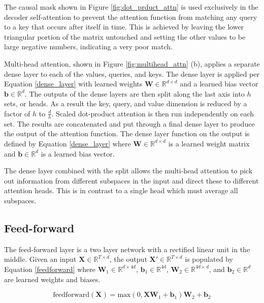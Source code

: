 The causal mask shown in Figure \ref{fig:dot_prduct_attn} is used exclusively in the decoder self-attention to prevent the attention function from matching any query to a key that occurs after itself in time.
This is achieved by leaving the lower triangular portion of the matrix untouched and setting the other values to be large negative numbers, indicating a very poor match.

Multi-head attention, shown in Figure \ref{fig:multihead_attn} (b), applies a separate dense layer to each of the values, queries, and keys. 
The dense layer is applied per Equation \ref{dense_layer} with learned weights $\boldsymbol{W} \in \mathbb{R}^{d \times d}$ and a learned bias vector $\boldsymbol{b} \in \mathbb{R}^{d}$.
The outputs of the dense layers are then split along the last axis into $h$ sets, or heads.
As a result the key, query, and value dimension is reduced by a factor of $h$ to $\frac{d}{h}$.
Scaled dot-product attention is then run independently on each set.
The results are concatenated and put through a final dense layer to produce the output of the attention function.
The dense layer function on the output is defined by Equation \ref{dense_layer} where $\boldsymbol{W} \in \mathbb{R}^{d \times d}$ is a learned weight matrix and $\boldsymbol{b} \in \mathbb{R}^{d}$ is a learned bias vector.

The dense layer combined with the split allows the multi-head attention to pick out information from different subspaces in the input and direct these to different attention heads.
This is in contrast to a single head which must average all subspaces.

\subsection{Feed-forward}
The feed-forward layer is a two layer network with a rectified linear unit in the middle.
Given an input $\boldsymbol{X} \in \mathbb{R}^{T \times d}$, the output $\boldsymbol{X'} \in \mathbb{R}^{T \times d}$ is populated by Equation \ref{feedforward} where $\boldsymbol{W}_1 \in \mathbb{R}^{d \times 4d}$, $\boldsymbol{b}_1 \in \mathbb{R}^{4d}$, $\boldsymbol{W}_2 \in \mathbb{R}^{4d \times d}$, and $\boldsymbol{b}_2 \in \mathbb{R}^{d}$ are learned weights and biases.

\begin{equation} \label{feedforward}
\text{feedforward}(\boldsymbol{X}) = \text{max}(0, \boldsymbol{X}  \boldsymbol{W}_1 + \boldsymbol{b}_1)  \boldsymbol{W}_2 + \boldsymbol{b}_2
\end{equation}

